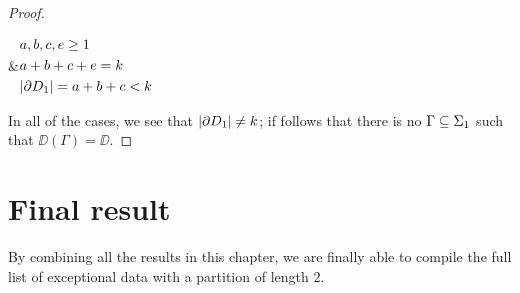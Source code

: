 \begin{proof}
\begin{enumarabic}
\begin{dessintext}
{
}&$\begin{aligned}
&a,b,c,e\ge 1\\
&a+b+c+e=k\\
&\lvert \partial D_1\rvert=a+b+c<k
\end{aligned}$
\end{dessintext}
\end{enumarabic}

In all of the cases, we see that $\lvert \partial D_1\rvert\neq k$; if follows that there is no \dessin{} $\Gamma\subseteq\Sigma_{1}$ such that $\DD(\Gamma)=\DD$.
\end{proof}


\section{Final result}

By combining all the results in this chapter, we are finally able to compile the full list of exceptional data with a partition of length $2$.

